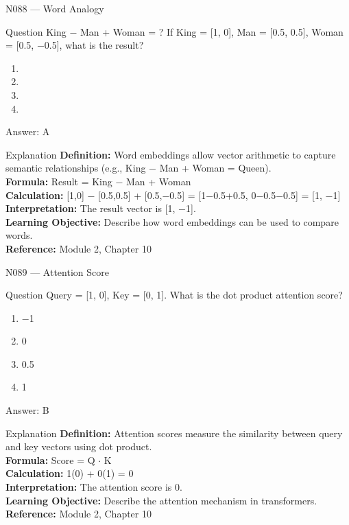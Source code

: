 \documentclass[aspectratio=169,8pt]{beamer}
\begin{document}
	\begin{frame}{N088 --- Word Analogy}
		\begin{block}{Question}
			King $-$ Man + Woman = ? If King = [1, 0], Man = [0.5, 0.5], Woman = [0.5, $-$0.5], what is the result?
			\begin{enumerate}
				\item [1, $-$1]
				\item [1, 0]
				\item [0.5, $-$0.5]
				\item [0, 1]
			\end{enumerate}
		\end{block}
		\begin{exampleblock}{Answer: A}\end{exampleblock}
		\begin{block}{Explanation}
			\textbf{Definition:} Word embeddings allow vector arithmetic to capture semantic relationships (e.g., King $-$ Man + Woman = Queen).\\
			\textbf{Formula:} Result = King $-$ Man + Woman\\
			\textbf{Calculation:} [1,0] $-$ [0.5,0.5] + [0.5,$-$0.5] = [1$-$0.5+0.5, 0$-$0.5$-$0.5] = [1, $-$1]\\
			\textbf{Interpretation:} The result vector is [1, $-$1].\\
			\textbf{Learning Objective:} Describe how word embeddings can be used to compare words.\\
			\textbf{Reference:} Module 2, Chapter 10
		\end{block}
	\end{frame}
	
	\begin{frame}{N089 --- Attention Score}
		\begin{block}{Question}
			Query = [1, 0], Key = [0, 1]. What is the dot product attention score?
			\begin{enumerate}
				\item $-$1
				\item 0
				\item 0.5
				\item 1
			\end{enumerate}
		\end{block}
		\begin{exampleblock}{Answer: B}\end{exampleblock}
		\begin{block}{Explanation}
			\textbf{Definition:} Attention scores measure the similarity between query and key vectors using dot product.\\
			\textbf{Formula:} Score = Q $\cdot$ K\\
			\textbf{Calculation:} 1(0) + 0(1) = 0\\
			\textbf{Interpretation:} The attention score is 0.\\
			\textbf{Learning Objective:} Describe the attention mechanism in transformers.\\
			\textbf{Reference:} Module 2, Chapter 10
		\end{block}
	\end{frame}
	
\end{document}
